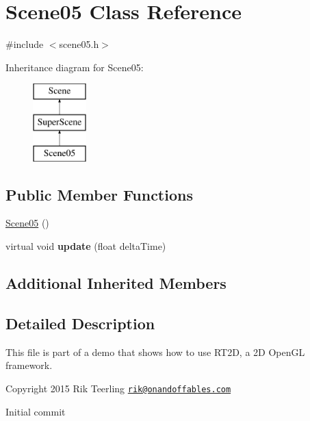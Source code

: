 \hypertarget{class_scene05}{}\section{Scene05 Class Reference}
\label{class_scene05}


{\ttfamily \#include $<$scene05.\+h$>$}

Inheritance diagram for Scene05\+:\begin{figure}[H]
\begin{center}
\leavevmode
\includegraphics[height=3.000000cm]{class_scene05}
\end{center}
\end{figure}
\subsection*{Public Member Functions}
\begin{DoxyCompactItemize}
\item 
\hyperlink{class_scene05_af2500fef131d671d494dd87453b6f9a6}{Scene05} ()
\item 
\mbox{\label{class_scene05_a130eb27e91bce97625df565cf7054b3f}} 
virtual void {\bfseries update} (float delta\+Time)
\end{DoxyCompactItemize}
\subsection*{Additional Inherited Members}


\subsection{Detailed Description}
This file is part of a demo that shows how to use R\+T2D, a 2D Open\+GL framework.


\begin{DoxyItemize}
\item Copyright 2015 Rik Teerling \href{mailto:rik@onandoffables.com}{\tt rik@onandoffables.\+com}
\begin{DoxyItemize}
\item Initial commit 
\end{DoxyItemize}
\end{DoxyItemize}

